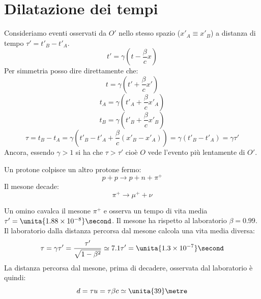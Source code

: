 \section{Dilatazione dei tempi}
Consideriamo eventi osservati da $O'$ nello stesso spazio ($x'_A\equiv x'_B$) a distanza di tempo $\tau'=t'_B-t'_A$.
\begin{equation*}t'=\gamma\left(t-\frac{\beta}{c}x\right)\end{equation*}
Per simmetria posso dire direttamente che:
\begin{equation*}t=\gamma\left(t'+\frac{\beta}{c}x'\right)\end{equation*}
\begin{equation*}t_A=\gamma\left(t'_A+\frac{\beta}{c}x'_A\right)\end{equation*}
\begin{equation*}t_B=\gamma\left(t'_B+\frac{\beta}{c}x'_B\right)\end{equation*}
\begin{equation}
\tau=t_B-t_A=\gamma\left(t'_B-t'_A+\frac{\beta}{c}\left(x'_B-x'_A\right)\right)=\gamma\left(t'_B-t'_A\right)=\gamma\tau'
\end{equation}
Ancora, essendo $\gamma>1$ si ha che $\tau>\tau'$ cioè $O$ vede l'evento più lentamente di $O'$.

\begin{Es}
Un protone colpisce un altro protone fermo:
\begin{equation*}p+p\rightarrow p+n+\pi^+\end{equation*}
Il mesone decade:
\begin{equation*}\pi^+ \rightarrow \mu ^+ + \nu\end{equation*}

Un omino cavalca il mesone $\pi^+$ e osserva un tempo di vita media $\tau'=\unita{1.88\times 10^{-8}}\second$. Il mesone ha rispetto al laboratorio $\beta=0.99$. Il laboratorio dalla distanza percorsa dal mesone calcola una vita media diversa:
\begin{equation*}\tau=\gamma\tau'=\frac{\tau'}{\sqrt{1-\beta^2}}\simeq 7.1\tau'=\unita{1.3\times 10^{-7}}\second\end{equation*}
La distanza percorsa dal mesone, prima di decadere, osservata dal laboratorio è quindi:
\begin{equation*}d=\tau u=\tau \beta c\simeq \unita{39}\metre\end{equation*}
\end{Es}

